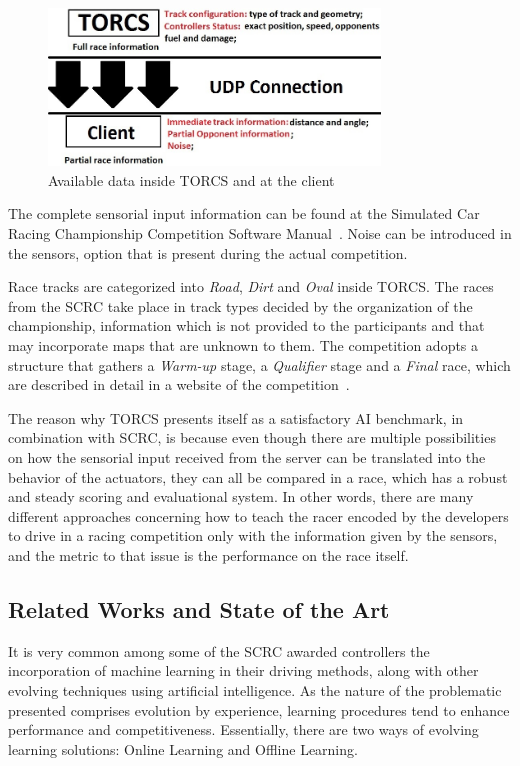    	\begin{figure}[h]
   		
		\centering
		\includegraphics[width=250pt]{Figure1.jpg}
		\caption{Available data inside TORCS and at the client}
		\label{Fig:Comm}
		
	\end{figure}
	
	The complete sensorial input information can be found at the Simulated Car Racing Championship Competition Software Manual~\cite{SCRC}. Noise can be introduced in the sensors, option that is present during the actual competition.

	Race tracks are categorized into \emph{Road}, \emph{Dirt} and \emph{Oval} inside TORCS. The races from the SCRC take place in track types decided by the organization of the championship, information which is not provided to the participants and that may incorporate maps that are unknown to them. The competition adopts a structure that gathers a \textit{Warm-up} stage, a \textit{Qualifier} stage and a \textit{Final} race, which are described in detail in a website of the competition~\cite{SCRC}.
	
	The reason why TORCS presents itself as a satisfactory AI benchmark, in combination with SCRC, is because even	though there are multiple possibilities on how the sensorial input received from the server can be translated into the behavior of the actuators, they can all be compared in a race, which has a robust and steady scoring and evaluational system. In other words, there are many different approaches concerning how to teach the racer encoded by the developers to drive in a racing competition only with the information given by the sensors, and the metric to that issue is the performance on the race itself.

\subsection{Related Works and State of the Art} \label{subsec:Related}
	
	It is very common among some of the SCRC awarded controllers the incorporation of machine learning in their driving methods, along with other evolving techniques using artificial intelligence. As the nature of the problematic presented comprises evolution by experience, learning procedures tend to enhance performance and competitiveness. Essentially, there are two ways of evolving learning solutions: Online Learning and Offline Learning.

